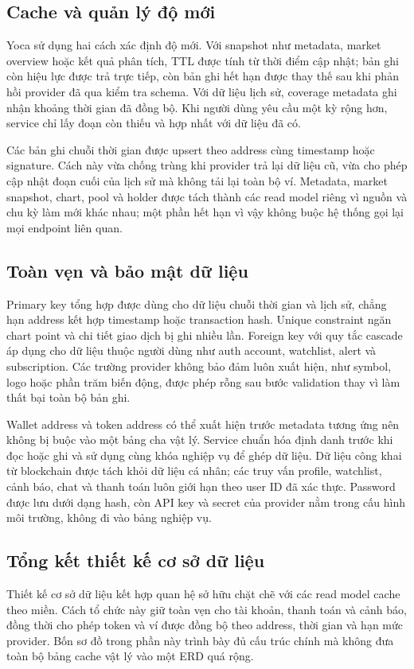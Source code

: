 \subsection{Cache và quản lý độ mới}
\label{subsec:db_cache}

Yoca sử dụng hai cách xác định độ mới. Với snapshot như metadata, market overview hoặc kết quả phân tích, TTL được tính từ thời điểm cập nhật; bản ghi còn hiệu lực được trả trực tiếp, còn bản ghi hết hạn được thay thế sau khi phản hồi provider đã qua kiểm tra schema. Với dữ liệu lịch sử, coverage metadata ghi nhận khoảng thời gian đã đồng bộ. Khi người dùng yêu cầu một kỳ rộng hơn, service chỉ lấy đoạn còn thiếu và hợp nhất với dữ liệu đã có.

Các bản ghi chuỗi thời gian được upsert theo address cùng timestamp hoặc signature. Cách này vừa chống trùng khi provider trả lại dữ liệu cũ, vừa cho phép cập nhật đoạn cuối của lịch sử mà không tải lại toàn bộ ví. Metadata, market snapshot, chart, pool và holder được tách thành các read model riêng vì nguồn và chu kỳ làm mới khác nhau; một phần hết hạn vì vậy không buộc hệ thống gọi lại mọi endpoint liên quan.

\subsection{Toàn vẹn và bảo mật dữ liệu}
\label{subsec:db_toan_ven}

Primary key tổng hợp được dùng cho dữ liệu chuỗi thời gian và lịch sử, chẳng hạn address kết hợp timestamp hoặc transaction hash. Unique constraint ngăn chart point và chi tiết giao dịch bị ghi nhiều lần. Foreign key với quy tắc cascade áp dụng cho dữ liệu thuộc người dùng như auth account, watchlist, alert và subscription. Các trường provider không bảo đảm luôn xuất hiện, như symbol, logo hoặc phần trăm biến động, được phép rỗng sau bước validation thay vì làm thất bại toàn bộ bản ghi.

Wallet address và token address có thể xuất hiện trước metadata tương ứng nên không bị buộc vào một bảng cha vật lý. Service chuẩn hóa định danh trước khi đọc hoặc ghi và sử dụng cùng khóa nghiệp vụ để ghép dữ liệu. Dữ liệu công khai từ blockchain được tách khỏi dữ liệu cá nhân; các truy vấn profile, watchlist, cảnh báo, chat và thanh toán luôn giới hạn theo user ID đã xác thực. Password được lưu dưới dạng hash, còn API key và secret của provider nằm trong cấu hình môi trường, không đi vào bảng nghiệp vụ.

\subsection{Tổng kết thiết kế cơ sở dữ liệu}
\label{subsec:db_tong_ket}

Thiết kế cơ sở dữ liệu kết hợp quan hệ sở hữu chặt chẽ với các read model cache theo miền. Cách tổ chức này giữ toàn vẹn cho tài khoản, thanh toán và cảnh báo, đồng thời cho phép token và ví được đồng bộ theo address, thời gian và hạn mức provider. Bốn sơ đồ trong phần này trình bày đủ cấu trúc chính mà không đưa toàn bộ bảng cache vật lý vào một ERD quá rộng.
